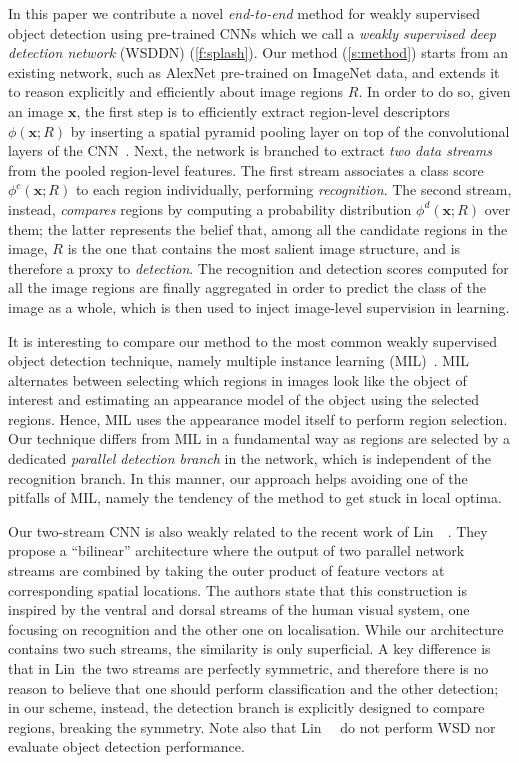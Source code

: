 \documentclass[10pt,twocolumn,letterpaper]{article}
\newcommand{\bx}{\mathbf{x}}
\begin{document}
In this paper we contribute a novel {\em end-to-end} method for weakly supervised object detection using pre-trained CNNs which we call a \emph{weakly supervised deep detection network} (WSDDN) (\cref{f:splash}). Our method (\cref{s:method}) starts from an existing network, such as AlexNet pre-trained on ImageNet data, and extends it to reason explicitly and efficiently about image regions $R$. In order to do so, given an image $\bx$, the first step is to efficiently extract region-level descriptors $\phi(\bx;R)$ by inserting a spatial pyramid pooling layer on top of the convolutional layers of the CNN~\cite{He14,Girshick15}. Next,  the network is branched to extract \emph{two data streams} from the pooled region-level features. The first stream associates a class score $\phi^c(\bx;R)$ to each region individually, performing \emph{recognition}.  The second stream, instead, \emph{compares} regions by computing a probability distribution $\phi^d(\bx;R)$ over them; the latter represents the belief that, among all the candidate regions in the image,  $R$ is the one that contains the most salient image structure, and is therefore a proxy to \emph{detection}. The recognition and detection scores computed for all the image regions are finally aggregated in order to predict the class of the image as a whole, which is then used to inject image-level supervision in learning.

It is interesting to compare our method to the most common weakly supervised object detection technique, namely multiple instance learning (MIL)~\cite{Dietterich97}. MIL alternates between selecting which regions in images look like  the object of interest and estimating an appearance model of the object using the selected regions. Hence, MIL uses the appearance model itself to perform region selection. Our technique differs from MIL in a fundamental way as regions are selected by a dedicated \emph{parallel detection branch} in the network, which is independent of the recognition branch. In this manner, our approach helps avoiding one of the pitfalls of MIL, namely the tendency of the method to get stuck in local optima. 

Our two-stream CNN is also weakly related to the recent work of Lin~\etal~\cite{Lin15}. They propose a ``bilinear'' architecture where the output of two parallel network streams are combined by taking the outer product of feature vectors at corresponding spatial locations. The authors state that this construction is inspired by the ventral and dorsal streams of the human visual system, one focusing on recognition and the other one on localisation. While our architecture contains two such streams, the similarity is only superficial. A key difference is that in Lin~\etal the two streams are perfectly symmetric, and therefore there is no reason to believe that one should perform classification and the other detection; in our scheme, instead, the detection branch is explicitly designed to compare regions, breaking the symmetry. Note also that Lin~\etal~\cite{Lin15} do not perform WSD nor evaluate object detection performance.
\end{document}
